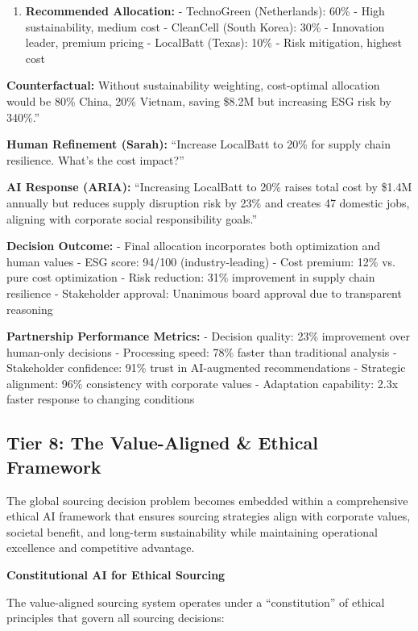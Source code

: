 \documentclass{article}
\begin{document}
\begin{enumerate}
\item \textbf{Recommended Allocation:}
   - TechnoGreen (Netherlands): 60\% - High sustainability, medium cost
   - CleanCell (South Korea): 30\% - Innovation leader, premium pricing  
   - LocalBatt (Texas): 10\% - Risk mitigation, highest cost
\end{enumerate}

\textbf{Counterfactual:} Without sustainability weighting, cost-optimal allocation would be 80\% China, 20\% Vietnam, saving \$8.2M but increasing ESG risk by 340\%.''

\textbf{Human Refinement (Sarah):} ``Increase LocalBatt to 20\% for supply chain resilience. What's the cost impact?''

\textbf{AI Response (ARIA):} ``Increasing LocalBatt to 20\% raises total cost by \$1.4M annually but reduces supply disruption risk by 23\% and creates 47 domestic jobs, aligning with corporate social responsibility goals.''

\textbf{Decision Outcome:}
- Final allocation incorporates both optimization and human values
- ESG score: 94/100 (industry-leading)
- Cost premium: 12\% vs. pure cost optimization
- Risk reduction: 31\% improvement in supply chain resilience  
- Stakeholder approval: Unanimous board approval due to transparent reasoning

\textbf{Partnership Performance Metrics:}
- Decision quality: 23\% improvement over human-only decisions
- Processing speed: 78\% faster than traditional analysis
- Stakeholder confidence: 91\% trust in AI-augmented recommendations
- Strategic alignment: 96\% consistency with corporate values
- Adaptation capability: 2.3x faster response to changing conditions

\subsection{Tier 8: The Value-Aligned \& Ethical Framework}

The global sourcing decision problem becomes embedded within a comprehensive ethical AI framework that ensures sourcing strategies align with corporate values, societal benefit, and long-term sustainability while maintaining operational excellence and competitive advantage.

\textbf{Constitutional AI for Ethical Sourcing}

The value-aligned sourcing system operates under a ``constitution'' of ethical principles that govern all sourcing decisions:
\end{document}
